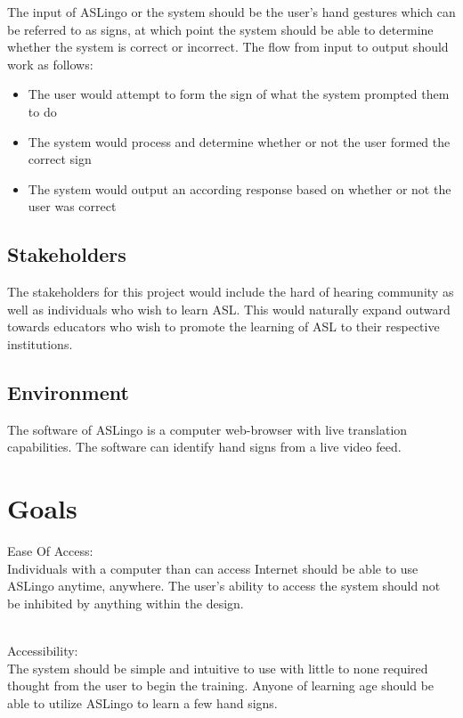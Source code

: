 \documentclass{article}
\begin{document}
The input of ASLingo or the system should be the user's hand gestures which can be referred to as signs, at which point the system should be able to determine whether the system is correct or incorrect. The flow from input to output should work as follows:

\begin{itemize}
    \item The user would attempt to form the sign of what the system prompted them to do
    \item The system would process and determine whether or not the user formed the correct sign
    \item The system would output an according response based on whether or not the user was correct
\end{itemize}

\subsection{Stakeholders}

The stakeholders for this project would include the hard of hearing community as well as individuals who wish to learn ASL. This would naturally expand outward towards educators who wish to promote the learning of ASL to their respective institutions.

\subsection{Environment}

The software of ASLingo is a computer web-browser with live translation capabilities. The software can identify hand signs from a live video feed.

\section{Goals}

Ease Of Access:\\
Individuals with a computer than can access Internet should be able to use ASLingo anytime, anywhere. The user's ability to access the system should not be inhibited by anything within the design.

~\\Accessibility:\\
The system should be simple and intuitive to use with little to none required thought from the user to begin the training. Anyone of learning age should be able to utilize ASLingo to learn a few hand signs. 
\end{document}
